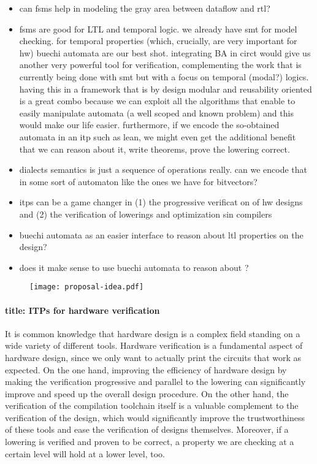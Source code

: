 \documentclass[]{article}
\begin{document}
\begin{itemize}
    \item can fsms help in modeling the gray area between dataflow and rtl?
    \item fsms are good for LTL and temporal logic. we already have smt for model checking. for temporal properties (which, crucially, are very important for hw) buechi automata are our best shot. 
        integrating BA in circt would give us another very powerful tool for verification, complementing the work that is currently being done with smt but with a focus on temporal (modal?) logics. 
        having this in a framework that is by design modular and reusability oriented is a great combo because we can exploit all the algorithms that enable to easily manipulate automata (a well scoped and known problem)
        and this would make our life easier. furthermore, if we encode the so-obtained automata in an itp such as lean, we might even get the additional benefit that we can reason about it, write theorems, 
        prove the lowering correct. 
    \item dialects semantics is just a sequence of operations really. can we encode that in some sort of automaton like the ones we have for bitvectors? 
    \item itps can be a game changer in (1) the progressive verificat on of hw designs and (2) the verification of lowerings and optimization sin compilers
    \item buechi automata as an easier interface to reason about ltl properties on the design?
    \item does it make sense to use buechi automata to reason about ?
\end{itemize}

\begin{figure}
    \centering 
    \texttt{[image: proposal-idea.pdf]}
\end{figure}

\paragraph{title: ITPs for hardware verification}









It is common knowledge that hardware design is a complex field standing on a wide variety of different tools. 
Hardware verification is a fundamental aspect of hardware design, since we only want to actually print the circuits that work as expected.
On the one hand, improving the efficiency of hardware design by making the verification progressive and parallel to the lowering can significantly improve and speed up the overall design procedure.
On the other hand, the verification of the compilation toolchain itself is a valuable complement to the verification of the design, which would significantly improve the trustworthiness of these tools and 
ease the verification of designs themselves. 
Moreover, if a lowering is verified and proven to be correct, a property we are checking at a certain level will hold at a lower level, too. 
\end{document}
